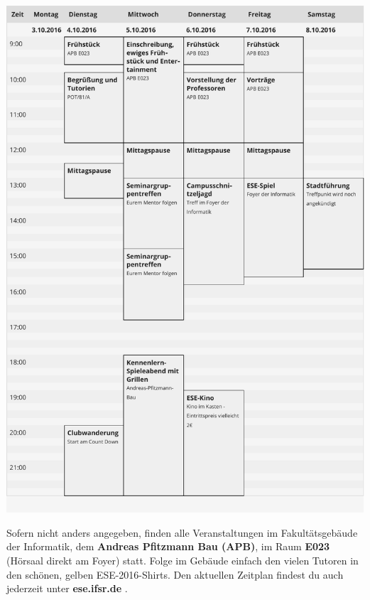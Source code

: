 %



\vfill
\begin{center}
\includegraphics[height=.60\dimen108,keepaspectratio]{img/zeitplan.pdf}%
\vfill

Sofern nicht anders angegeben, finden alle Veranstaltungen im Fakultätsgebäude der Informatik, dem
\textbf{Andreas Pfitzmann Bau (APB)}, im Raum \textbf{E023} (Hörsaal direkt am Foyer) statt.
Folge im Gebäude einfach den vielen Tutoren in den schönen, gelben ESE-2016-Shirts.
Den aktuellen Zeitplan findest du auch jederzeit unter \textbf{ese.ifsr.de} .

\end{center}
\mbox{}
